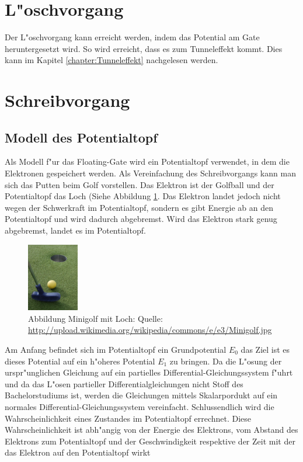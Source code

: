 \begin{refsection}
\section{L"oschvorgang}
Der L"oschvorgang kann erreicht werden, indem das Potential am Gate
heruntergesetzt wird. So wird erreicht, dass es zum Tunneleffekt
kommt. Dies kann im Kapitel \ref{chapter:Tunneleffekt} nachgelesen werden.


\section{Schreibvorgang}

\subsection{Modell des Potentialtopf}
Als Modell f"ur das Floating-Gate wird ein Potentialtopf verwendet,
in dem die Elektronen gespeichert werden.
Als Vereinfachung des Schreibvorgangs kann man sich das Putten beim
Golf vorstellen. Das Elektron ist der Golfball und der Potentialtopf
das Loch (Siehe Abbildung \ref{skript:Minigolf}. Das Elektron landet
jedoch nicht wegen der Schwerkraft im Potentialtopf, sondern es gibt
Energie ab an den Potentialtopf und wird dadurch abgebremst. Wird das
Elektron stark genug abgebremst, landet es im Potentialtopf.

\begin{figure}
\centering
\includegraphics[width=0.2\textwidth]{flash/graphics/Minigolf.jpg}
\caption{Abbildung Minigolf mit Loch: Quelle:
\url{http://upload.wikimedia.org/wikipedia/commons/e/e3/Minigolf.jpg}
\label{skript:Minigolf}}
\end{figure}

Am Anfang befindet sich im Potentialtopf ein Grundpotential $E_{0}$
das Ziel ist es dieses Potential auf ein h"oheres Potential $E_{1}$
zu bringen. Da die L"osung der urspr"unglichen Gleichung auf ein
partielles Differential-Gleichungssystem f"uhrt und da das L"osen
partieller Differentialgleichungen nicht Stoff des Bachelorstudiums
ist, werden die Gleichungen mittels Skalarpordukt auf ein normales
Differential-Gleichungssystem vereinfacht. Schlussendlich wird die
Wahrscheinlichkeit eines Zustandes im Potentialtopf errechnet. Diese
Wahrscheinlichkeit ist abh"angig von der Energie des Elektrons, vom
Abstand des Elektrons zum Potentialtopf und der Geschwindigkeit respektive
der Zeit mit der das Elektron auf den Potentialtopf wirkt


\end{refsection}
